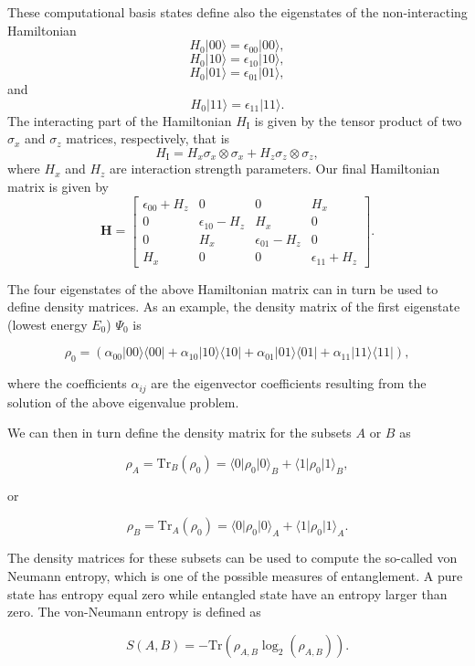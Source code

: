 \documentclass[%
oneside,                 %
final,                   %
10pt]{article}
\begin{document}
These computational basis states define also the eigenstates of the non-interacting  Hamiltonian
\[
H_0\vert 00 \rangle = \epsilon_{00}\vert 00 \rangle,
\]
\[
H_0\vert 10 \rangle = \epsilon_{10}\vert 10 \rangle,
\]
\[
H_0\vert 01 \rangle = \epsilon_{01}\vert 01 \rangle,
\]
and
\[
H_0\vert 11 \rangle = \epsilon_{11}\vert 11 \rangle.
\]
The interacting part of the Hamiltonian $H_{\mathrm{I}}$ is given by the tensor product of two $\sigma_x$ and $\sigma_z$  matrices, respectively, that is
\[
H_{\mathrm{I}}=H_x\sigma_x\otimes\sigma_x+H_z\sigma_z\otimes\sigma_z,
\]
where $H_x$ and $H_z$ are interaction strength parameters. Our final Hamiltonian matrix is given by
\[
\bm{H}=\begin{bmatrix} \epsilon_{00}+H_z & 0 & 0 & H_x \\
                       0  & \epsilon_{10}-H_z & H_x & 0 \\
		       0 & H_x & \epsilon_{01}-H_z & 0 \\
		       H_x & 0 & 0 & \epsilon_{11} +H_z \end{bmatrix}.
\] 

The four eigenstates of the above Hamiltonian matrix can in turn be used to
define density matrices. As an example, the density matrix of the
first eigenstate (lowest energy $E_0$) $\Psi_0$ is

\[
\rho_0=\left(\alpha_{00}\vert 00 \rangle\langle 00\vert+\alpha_{10}\vert 10 \rangle\langle 10\vert+\alpha_{01}\vert 01 \rangle\langle 01\vert+\alpha_{11}\vert 11 \rangle\langle 11\vert\right),
\]

where the coefficients $\alpha_{ij}$ are the eigenvector coefficients
resulting from the solution of the above eigenvalue problem.

We can
then in turn define the density matrix for the subsets $A$ or $B$ as

\[
\rho_A=\mathrm{Tr}_B(\rho_{0})=\langle 0 \vert \rho_{0} \vert 0\rangle_{B}+\langle 1 \vert \rho_{0} \vert 1\rangle_{B},
\]

or

\[
\rho_B=\mathrm{Tr}_A(\rho_0)=\langle 0 \vert \rho_{0} \vert 0\rangle_{A}+\langle 1 \vert \rho_{0} \vert 1\rangle_{A}.
\]

The density matrices for these subsets can be used to compute the
so-called von Neumann entropy, which is one of the possible measures
of entanglement. A pure state has entropy equal zero while entangled
state have an entropy larger than zero. The von-Neumann entropy is
defined as

\[
S(A,B)=-\mathrm{Tr}\left(\rho_{A,B}\log_2 (\rho_{A,B})\right).
\]
\end{document}
